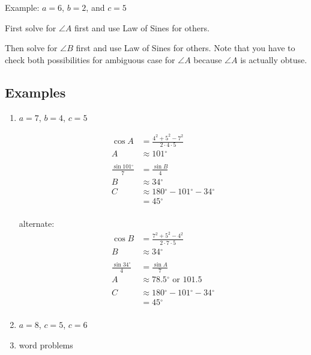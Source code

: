 \documentclass{exam}
\newcommand{\dg}{\ensuremath{^\circ}}
\begin{document}
  Example: $a = 6$, $b = 2$, and $c = 5$

  \begin{itemize*}
    \item First solve for $\angle A$ first and use Law of Sines for others.
    \item Then solve for $\angle B$ first and use Law of Sines for others.  Note that you have to check both
      possibilities for ambiguous case for $\angle A$ because $\angle A$ is actually obtuse.
  \end{itemize*}

  \subsection{Examples}

  \begin{enumerate}

    \item $a = 7$, $b = 4$, $c = 5$

      \begin{solution}
        \begin{align*}
          \cos A & = \frac{4^2 + 5^2 - 7^2}{2 \cdot 4 \cdot 5} \\
          A      & \approx 101 \dg \\
          \\
          \frac{\sin 101 \dg}{7} & = \frac{\sin B}{4} \\
          B                      & \approx 34 \dg
          \\
          C & \approx 180 \dg - 101 \dg - 34 \dg \\
            & = 45 \dg \\
        \end{align*}

        alternate:
        \begin{align*}
          \cos B & = \frac{7^2 + 5^2 - 4^2}{2 \cdot 7 \cdot 5} \\
          B      & \approx 34 \dg \\
          \\
          \frac{\sin 34 \dg}{4} & = \frac{\sin A}{7} \\
          A                      & \approx 78.5 \dg \text{ or } 101.5 \\
          \\
          C & \approx 180 \dg - 101 \dg - 34 \dg \\
            & = 45 \dg \\
        \end{align*}

      \end{solution}

    \item $a = 8$, $c = 5$, $c = 6$

    \item word problems

  \end{enumerate}
\end{document}
